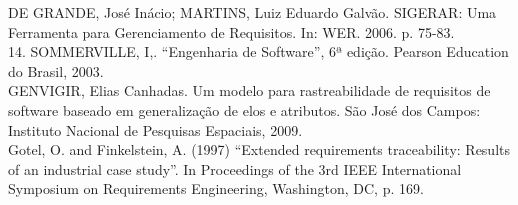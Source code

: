 DE GRANDE, José Inácio; MARTINS, Luiz Eduardo Galvão. SIGERAR: Uma Ferramenta para Gerenciamento de Requisitos. In: WER. 2006. p. 75-83.\\
14. SOMMERVILLE, I,. “Engenharia de Software”, 6ª edição. Pearson Education do Brasil, 2003.\\

GENVIGIR, Elias Canhadas. Um modelo para rastreabilidade de requisitos de software baseado em generalização de elos e atributos. São José dos Campos: Instituto Nacional de Pesquisas Espaciais, 2009.\\

Gotel, O. and Finkelstein, A. (1997) “Extended requirements traceability: Results of an industrial case study”. In Proceedings of the 3rd IEEE International Symposium on Requirements Engineering, Washington, DC, p. 169.\\

